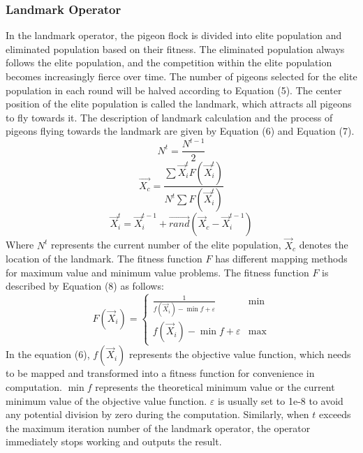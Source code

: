 \documentclass[preprint,review,compress,12pt]{elsarticle}
\begin{document}
\subsubsection{Landmark Operator}
In the landmark operator, the pigeon flock is divided into elite population and eliminated population based on their fitness. The eliminated population always follows the elite population, and the competition within the elite population becomes increasingly fierce over time. The number of pigeons selected for the elite population in each round will be halved according to Equation (5). The center position of the elite population is called the landmark, which attracts all pigeons to fly towards it. The description of landmark calculation and the process of pigeons flying towards the landmark are given by Equation (6) and Equation (7).
\begin{equation}
    {N^t} = \frac{{{N^{t - 1}}}}{2}
\end{equation}
\begin{equation}
    {\vec{X_c}} = \frac{{\sum {\vec{X}_i^t F(\vec{X}_i^t)} }}{{{N^t}\sum {F(\vec{X}_i^t)} }}
\end{equation}
\begin{equation}
    \vec{X}_i^t = \vec{X}_i^{t - 1} + \vec{rand}({\vec{X}_c} - \vec{X}_i^{t - 1})
\end{equation}
Where $N^t$ represents the current number of the elite population, $\vec{X}_c$ denotes the location of the landmark. The fitness function $F$ has different mapping methods for maximum value and minimum value problems. The fitness function $F$ is described by Equation (8) as follows:
\begin{equation}
    F({\vec{X}_i}) = \left\{ {\begin{array}{ccccccccccccccc}{\frac{1}{{f({\vec{X}_i}) - \min{f} + \varepsilon }}}&{\min }\\{f({\vec{X}_i}) - \min{f} + \varepsilon }&{\max }\end{array}} \right.
\end{equation}
In the equation (6), $f(\vec{X}_i)$ represents the objective value function, which needs to be mapped and transformed into a fitness function for convenience in computation. $\min{f}$ represents the theoretical minimum value or the current minimum value of the objective value function. $\varepsilon$ is usually set to 1e-8 to avoid any potential division by zero during the computation. Similarly, when $t$ exceeds the maximum iteration number of the landmark operator, the operator immediately stops working and outputs the result.
\end{document}
